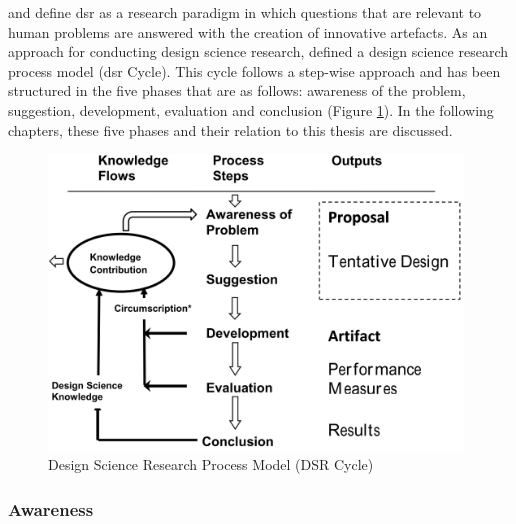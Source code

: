 \cite{Vaishnavi2008} and \cite{Hevner2010} define \gls{dsr} as a research paradigm in which questions that are relevant to human problems are answered with the creation of innovative artefacts. As an approach for conducting design science research, \cite{Vaishnavi2004} defined a design science research process model (\gls{dsr} Cycle). This cycle follows a step-wise approach and has been structured in the five phases that are as follows: awareness of the problem, suggestion, development, evaluation and conclusion (Figure \ref{fig:dsrcycle}). In the following chapters, these five phases and their relation to this thesis are discussed.
\newline
\begin{figure}[h]
	\begin{center}
		\includegraphics[width=11cm]{03_Figures/02_DSR_Cycle/DSR_Cycle.png}
		\caption[Design Science Research Process Model (DSR Cycle)]{Design Science Research Process Model (DSR Cycle) \citep{Vaishnavi2004}}
		\label{fig:dsrcycle}
	\end{center}
\end{figure}



\subsubsection{Awareness}

